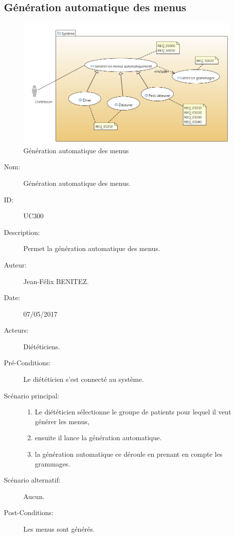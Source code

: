 \subsection{Génération automatique des menus}
\begin{figure}[H]
\label{MenuGen}
  \centering
      \includegraphics[width=1.00\textwidth]{../../CasDUtilisations/MenuGen/MenuGen.png} %
\caption{Génération automatique des menus}
\end{figure}

\begin{description}
\item[Nom:] Génération automatique des menus.
\item[ID:] UC300
\item[Description:] Permet la génération automatique des menus.
\item[Auteur:] Jean-Félix BENITEZ.
\item[Date:] 07/05/2017
\item[Acteurs:] Diététiciens.
\item[Pré-Conditions:] Le diététicien s'est connecté au système.
\item[Scénario principal:]
  \begin{enumerate}
  \item Le diététicien sélectionne le groupe de patients pour lequel il veut générer les menus,
  \item ensuite il lance la génération automatique.
  \item la génération automatique ce déroule en prenant en compte les grammages.
  \end{enumerate}
\item[Scénario alternatif:] Aucun.
\item[Post-Conditions:] Les menus sont générés.
\end{description}

